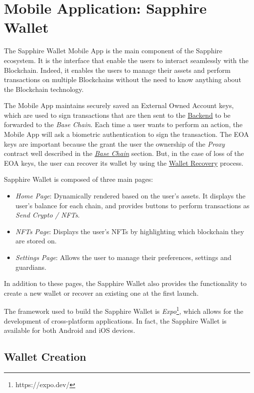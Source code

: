 \section{Mobile Application: Sapphire Wallet}
\label{sec:mobile_application}

The Sapphire Wallet Mobile App is the main component of the Sapphire ecosystem. It is the interface that enable the users to interact seamlessly with the Blockchain. Indeed, it enables the users to manage their assets and perform transactions on multiple Blockchains without the need to know anything about the Blockchain technology.

The Mobile App maintains securely saved an External Owned Account keys, which are used to sign transactions that are then sent to the \hyperref[sec:backend]{Backend} to be forwarded to the \textit{Base Chain}. Each time a user wants to perform an action, the Mobile App will ask a biometric authentication to sign the transaction. The EOA keys are important because the grant the user the ownership of the \textit{Proxy} contract well described in the \hyperref[subsec:base_chain]{\textit{Base Chain}} section. But, in the case of loss of the EOA keys, the user can recover its wallet by using the \hyperref[subsec:wallet_recovery]{Wallet Recovery} process.

Sapphire Wallet is composed of three main pages:
\begin{itemize}
    \item \textit{Home Page}: Dynamically rendered based on the user's assets. It displays the user's balance for each chain, and provides buttons to perform transactions as \textit{Send Crypto / NFTs}.
    \item \textit{NFTs Page}: Displays the user's NFTs by highlighting which blockchain they are stored on.
    \item \textit{Settings Page}: Allows the user to manage their preferences, settings and guardians. 
\end{itemize}

In addition to these pages, the Sapphire Wallet also provides the functionality to create a new wallet or recover an existing one at the first launch.

The framework used to build the Sapphire Wallet is \textit{Expo}\footnote{https://expo.dev/}, which allows for the development of cross-platform applications. In fact, the Sapphire Wallet is available for both Android and iOS devices.

\subsection{Wallet Creation}
\label{subsec:wallet_creation}

